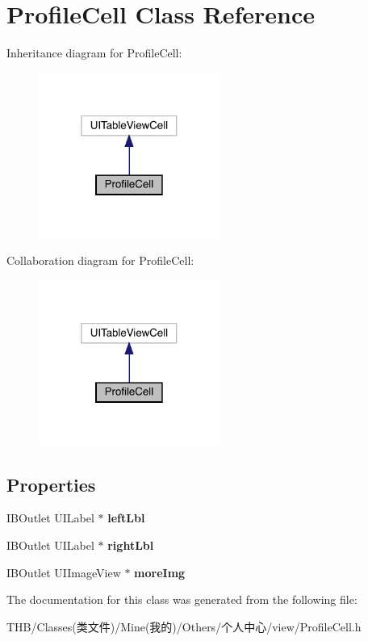 \hypertarget{interface_profile_cell}{}\section{Profile\+Cell Class Reference}
\label{interface_profile_cell}


Inheritance diagram for Profile\+Cell\+:\nopagebreak
\begin{figure}[H]
\begin{center}
\leavevmode
\includegraphics[width=169pt]{interface_profile_cell__inherit__graph}
\end{center}
\end{figure}


Collaboration diagram for Profile\+Cell\+:\nopagebreak
\begin{figure}[H]
\begin{center}
\leavevmode
\includegraphics[width=169pt]{interface_profile_cell__coll__graph}
\end{center}
\end{figure}
\subsection*{Properties}
\begin{DoxyCompactItemize}
\item 
\mbox{\label{interface_profile_cell_ac1a8534e7ea55bf364e643b6e7f3c01b}} 
I\+B\+Outlet U\+I\+Label $\ast$ {\bfseries left\+Lbl}
\item 
\mbox{\label{interface_profile_cell_a97534f629ad5b0646b49df3bfc550e5e}} 
I\+B\+Outlet U\+I\+Label $\ast$ {\bfseries right\+Lbl}
\item 
\mbox{\label{interface_profile_cell_a7d3da81b99e584ff6ca947b8193a4246}} 
I\+B\+Outlet U\+I\+Image\+View $\ast$ {\bfseries more\+Img}
\end{DoxyCompactItemize}


The documentation for this class was generated from the following file\+:\begin{DoxyCompactItemize}
\item 
T\+H\+B/\+Classes(类文件)/\+Mine(我的)/\+Others/个人中心/view/Profile\+Cell.\+h\end{DoxyCompactItemize}

